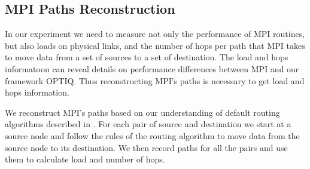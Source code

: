 \subsection{MPI Paths Reconstruction}

In our experiment we need to measure not only the performance of MPI routines, but also loads on physical links, and the number of hops per path that MPI takes to move data from a set of sources to a set of destination. The load and hops informatoon can reveal details on performance differences between MPI and our framework OPTIQ. Thus reconstructing MPI's paths is necessary to get load and hops information.

We reconstruct MPI's paths based on our understanding of default routing algorithms described in \cite{Chen:BGQ}. For each pair of source and destination we start at a source node and follow the rules of the routing algorithm to move data from the source node to its destination. We then record paths for all the pairs and use them to calculate load and number of hops.
